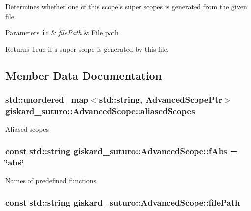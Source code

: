 Determines whether one of this scope's super scopes is generated from the given file. 


\begin{DoxyParams}[1]{Parameters}
\mbox{\tt in}  & {\em file\-Path} & File path\\
\hline
\end{DoxyParams}
\begin{DoxyReturn}{Returns}
True if a super scope is generated by this file. 
\end{DoxyReturn}


\subsection{Member Data Documentation}
\hypertarget{classgiskard__suturo_1_1AdvancedScope_a9a27c5f444714caf79ec05ac606c84a5}{
\subsubsection[{aliased\-Scopes}]{\setlength{\rightskip}{0pt plus 5cm}std\-::unordered\-\_\-map$<$std\-::string, Advanced\-Scope\-Ptr$>$ giskard\-\_\-suturo\-::\-Advanced\-Scope\-::aliased\-Scopes\hspace{0.3cm}{\ttfamily [private]}}}\label{classgiskard__suturo_1_1AdvancedScope_a9a27c5f444714caf79ec05ac606c84a5}
Aliased scopes \hypertarget{classgiskard__suturo_1_1AdvancedScope_a2cc175184a5c1f1e9ca8265cfb5463bc}{
\subsubsection[{f\-Abs}]{\setlength{\rightskip}{0pt plus 5cm}const std\-::string giskard\-\_\-suturo\-::\-Advanced\-Scope\-::f\-Abs = \char`\"{}abs\char`\"{}\hspace{0.3cm}{\ttfamily [static]}}}\label{classgiskard__suturo_1_1AdvancedScope_a2cc175184a5c1f1e9ca8265cfb5463bc}
Names of predefined functions \hypertarget{classgiskard__suturo_1_1AdvancedScope_a2b3e583a28325902fec73e0063646cab}{
\subsubsection[{file\-Path}]{\setlength{\rightskip}{0pt plus 5cm}const std\-::string giskard\-\_\-suturo\-::\-Advanced\-Scope\-::file\-Path}}\label{classgiskard__suturo_1_1AdvancedScope_a2b3e583a28325902fec73e0063646cab}
